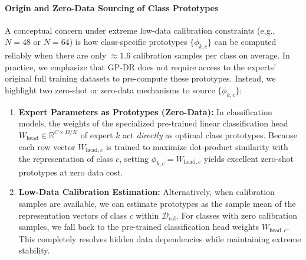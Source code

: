 \paragraph{Origin and Zero-Data Sourcing of Class Prototypes}
A conceptual concern under extreme low-data calibration constraints (e.g., $N=48$ or $N=64$) is how class-specific prototypes $\{\phi_{k,c}\}$ can be computed reliably when there are only $\approx 1.6$ calibration samples per class on average. In practice, we emphasize that GP-DR does not require access to the experts' original full training datasets to pre-compute these prototypes. Instead, we highlight two zero-shot or zero-data mechanisms to source $\{\phi_{k,c}\}$:
\begin{enumerate}
    \item \textbf{Expert Parameters as Prototypes (Zero-Data):} In classification models, the weights of the specialized pre-trained linear classification head $W_{\text{head}} \in \mathbb{R}^{C \times D/K}$ of expert $k$ act \emph{directly} as optimal class prototypes. Because each row vector $W_{\text{head}, c}$ is trained to maximize dot-product similarity with the representation of class $c$, setting $\phi_{k,c} = W_{\text{head}, c}$ yields excellent zero-shot prototypes at zero data cost.
    \item \textbf{Low-Data Calibration Estimation:} Alternatively, when calibration samples are available, we can estimate prototypes as the sample mean of the representation vectors of class $c$ within $\mathcal{D}_{\text{cal}}$. For classes with zero calibration samples, we fall back to the pre-trained classification head weights $W_{\text{head}, c}$. This completely resolves hidden data dependencies while maintaining extreme stability.
\end{enumerate}

